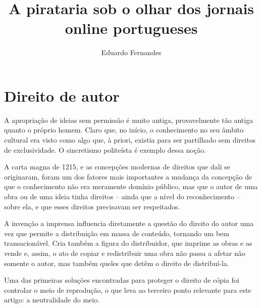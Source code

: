 \documentclass{apaKadu}
\title{A pirataria sob o olhar dos jornais online portugueses}
\author{Eduardo Fernandes}
\affiliation{Universidade Autónoma de Lisboa}
\begin{document}
\maketitle

\section{Direito de autor}

A apropriação de ideias sem permissão é muito antiga, provavelmente tão antiga quanto o próprio homem. Claro
que, no início, o conhecimento no seu âmbito cultural era visto como algo que, à priori, existia para ser partilhado sem direitos de exclusividade. O sincretismo politeísta é exemplo dessa noção.

A carta magna de 1215, e as concepções modernas de direitos que dali se originaram, foram um dos fatores mais importantes a mudança da concepção de que o conhecimento não era meramente domínio público, mas que o autor de uma obra ou de uma ideia tinha direitos – ainda que a nível do reconhecimento – sobre ela, e que esses direitos precisavam ser respeitados.

A invenção a imprensa influencia diretamente a questão do direito do autor uma vez que permite a distribuição em massa de conteúdo, tornando um bem transacionável. Cria também a figura do distribuidor, que imprime as obras e as vende e, assim, o ato de copiar e redistribuir uma obra não passa a afetar não somente o autor, mas também queles que detêm o direito de distribuí-la.

Uma das primeiras soluções encontradas para proteger o direito de cópia foi controlar o meio de reprodução, o que leva ao terceiro ponto relevante para este artigo: a neutralidade do meio.

\printbibliography
\end{document}
